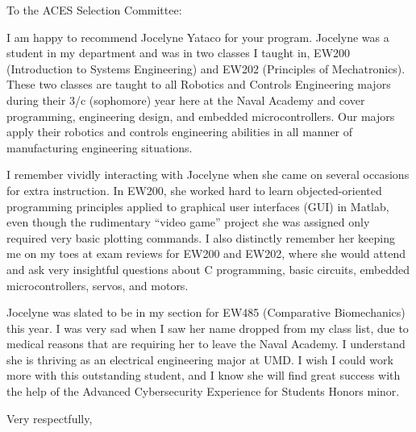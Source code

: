 \documentclass[12pt]{wrceletter}
\date{\today}
\begin{document}
\begin{letter}{%
}

\opening{To the ACES Selection Committee:}
\raggedright %
\setlength{\parindent}{15pt} %

I am happy to recommend Jocelyne Yataco for your program. Jocelyne was a student in my department and was in two classes I taught in, EW200 (Introduction to Systems Engineering) and EW202 (Principles of Mechatronics). These two classes are taught to all Robotics and Controls Engineering majors during their 3/c (sophomore) year here at the Naval Academy and cover programming, engineering design, and embedded microcontrollers. Our majors apply their robotics and controls engineering abilities in all manner of manufacturing engineering situations.   

I remember vividly interacting with Jocelyne when she came on several occasions for extra instruction. In EW200, she worked hard to learn objected-oriented programming principles applied to graphical user interfaces (GUI) in Matlab, even though the rudimentary ``video game'' project she was assigned only required very basic plotting commands. I also distinctly remember her keeping me on my toes at exam reviews for EW200 and EW202, where she would attend and ask very insightful questions about C programming, basic circuits, embedded microcontrollers, servos, and motors. 

Jocelyne was slated to be in my section for EW485 (Comparative Biomechanics) this year. I was very sad when I saw her name dropped from my class list, due to medical reasons that are requiring her to leave the Naval Academy. I understand she is thriving as an electrical engineering major at UMD. I wish I could work more with this outstanding student, and I know she will find great success with the help of the Advanced Cybersecurity Experience for Students Honors minor.



\closing{Very respectfully,} %

\end{letter}
\end{document}
